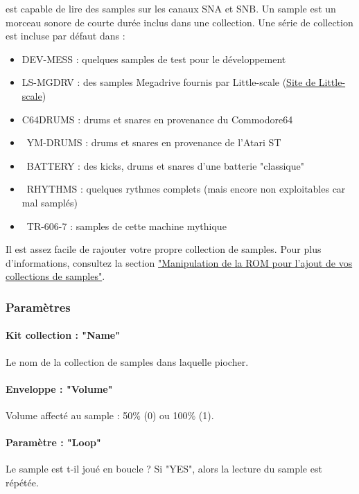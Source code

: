 \FAT est capable de lire des samples sur les canaux SNA et SNB.
Un sample est un morceau sonore de courte durée inclus dans une collection.
Une série de collection est incluse par défaut dans \FAT :\medskip

\begin{itemize}
    \item {DEV-MESS : quelques samples de test pour le développement}
    \item {LS-MGDRV : des samples Megadrive fournis par Little-scale (\href{http://little-scale.blogspot.fr/2008/08/sega-mega-drive-sample-pack.html}{Site de Little-scale})}
    \item {C64DRUMS : drums et snares en provenance du Commodore64}
    \item {YM-DRUMS : drums et snares en provenance de l'Atari ST}
    \item {BATTERY : des kicks, drums et snares d'une batterie "classique"}
    \item {RHYTHMS : quelques rythmes complets (mais encore non exploitables car mal samplés)}
    \item {TR-606-7 : samples de cette machine mythique}
\end{itemize} \medskip

Il est assez facile de rajouter votre propre collection de samples. Pour plus d'informations, consultez la section \hyperref[sec:addsamples]{"Manipulation de la ROM pour l'ajout de vos collections de samples"}.


\subsubsection{Paramètres}

\paragraph{Kit collection : "Name"} Le nom de la collection de samples dans laquelle piocher.

\paragraph{Enveloppe : "Volume"} Volume affecté au sample : 50\% (0) ou 100\% (1).

\paragraph{Paramètre : "Loop"} Le sample est t-il joué en boucle ?
                                Si "YES", alors la lecture du sample est répétée.

